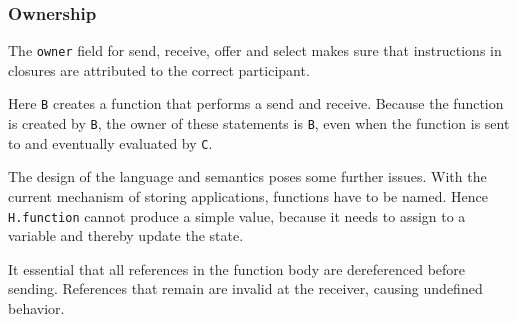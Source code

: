 \documentclass[runningheads]{llncs}
\newenvironment{Shaded}{}{}
\newcommand{\KeywordTok}[1]{\textcolor[rgb]{0.00,0.44,0.13}{\textbf{#1}}}
\newcommand{\DataTypeTok}[1]{\textcolor[rgb]{0.56,0.13,0.00}{#1}}
\newcommand{\DecValTok}[1]{\textcolor[rgb]{0.25,0.63,0.44}{#1}}
\newcommand{\StringTok}[1]{\textcolor[rgb]{0.25,0.44,0.63}{#1}}
\newcommand{\OtherTok}[1]{\textcolor[rgb]{0.00,0.44,0.13}{#1}}
\newcommand{\FunctionTok}[1]{\textcolor[rgb]{0.02,0.16,0.49}{#1}}
\newcommand{\NormalTok}[1]{#1}
\begin{document}
\subsubsection{Ownership}\label{ownership}

The \texttt{owner} field for send, receive, offer and select makes
sure that instructions in closures are attributed to the correct
participant.

\begin{Shaded}
\end{Shaded}

Here \texttt{B} creates a function that performs a send and receive.
Because the function is created by \texttt{B}, the owner of these
statements is \texttt{B}, even when the function is sent to and
eventually evaluated by \texttt{C}.

The design of the language and semantics poses some further issues. With
the current mechanism of storing applications, functions have to be
named. Hence \texttt{H.function} cannot produce a simple value, because
it needs to assign to a variable and thereby update the state.

It essential that all references in the function body are dereferenced
before sending. References that remain are invalid at the receiver,
causing undefined behavior.
\end{document}
